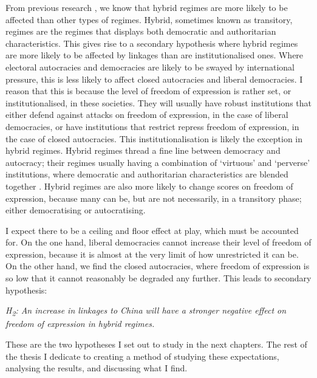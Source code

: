From previous research \citep{toettoe_foreign_2023}, we know that hybrid regimes are more likely to be affected than other types of regimes. Hybrid, sometimes known as transitory, regimes are the regimes that displays both democratic and authoritarian characteristics. This gives rise to a secondary hypothesis where hybrid regimes are more likely to be affected by linkages than are institutionalised ones. Where electoral autocracies and democracies are likely to be swayed by international pressure, this is less likely to affect closed autocracies and liberal democracies. I reason that this is because the level of freedom of expression is rather set, or institutionalised, in these societies. They will usually have robust institutions that either defend against attacks on freedom of expression, in the case of liberal democracies, or have institutions that restrict repress freedom of expression, in the case of closed autocracies. This institutionalisation is likely the exception in hybrid regimes. Hybrid regimes thread a fine line between democracy and autocracy; their regimes usually having a combination of `virtuous' and `perverse' institutions, where democratic and authoritarian characteristics are blended together \citep{valenzuela_democratic_1990}. Hybrid regimes are also more likely to change scores on freedom of expression, because many can be, but are not necessarily, in a transitory phase; either democratising or autocratising.

I expect there to be a ceiling and floor effect at play, which must be accounted for. On the one hand, liberal democracies cannot increase their level of freedom of expression, because it is almost at the very limit of how unrestricted it can be. On the other hand, we find the closed autocracies, where freedom of expression is so low that it cannot reasonably be degraded any further. This leads to secondary hypothesis:
\begin{displayquote}
    \textit{H\textsubscript{2}: An increase in linkages to China will have a stronger negative effect on freedom of expression in hybrid regimes.}
\end{displayquote}

These are the two hypotheses I set out to study in the next chapters. The rest of the thesis I dedicate to creating a method of studying these expectations, analysing the results, and discussing what I find. 